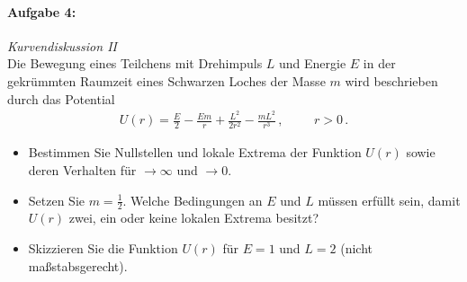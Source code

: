 \paragraph{Aufgabe 4: } \emph{Kurvendiskussion II}\\[0.2cm]
Die Bewegung eines Teilchens mit Drehimpuls $L$ und Energie $E$ in der gekrümmten Raumzeit eines Schwarzen Loches der Masse $m$ wird beschrieben durch das Potential
\begin{align*}
U(r)=\frac{E}{2}-\frac{Em}{r}+\frac{L^2}{2r^2}-\frac{mL^2}{r^3}\,, \hspace{1cm} r>0\,.
\end{align*}
\begin{itemize}
\item Bestimmen Sie Nullstellen und lokale Extrema der Funktion $U(r)$ sowie deren Verhalten für $\to\infty$ und $\to 0$.
\item Setzen Sie $m=\frac{1}{2}$. Welche Bedingungen an $E$ und $L$ müssen erfüllt sein, damit $U(r)$ zwei, ein oder keine lokalen Extrema besitzt?
\item Skizzieren Sie die Funktion $U(r)$ für $E=1$ und $L=2$ (nicht maßstabsgerecht).
\end{itemize} 
%
